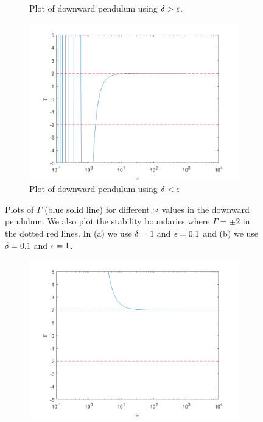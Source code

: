 \documentclass[12pt]{report}
\begin{document}
\begin{solution}
\begin{enumerate}
\begin{figure}[H]
\begin{subfigure}[b]{0.5\linewidth}
                \caption{Plot of downward pendulum using $\delta > {\epsilon}$.}
                \label{fig1:a}
                \vspace{4ex}
            \end{subfigure}%
            \begin{subfigure}[b]{0.5\linewidth}
                \centering
                \includegraphics[width=\linewidth]{images/d2.png}
                \caption{Plot of downward pendulum using $\delta < {\epsilon}$}
                \label{fig1:b}
                \vspace{4ex}
            \end{subfigure}
            \caption{Plots of $\Gamma$ (blue solid line) for different ${\omega}$ values in the downward pendulum. We also plot the stability boundaries where $\Gamma = \pm 2$ in the dotted red lines. In (a) we use $\delta = 1$ and ${\epsilon} = 0.1$ and (b) we use $\delta = 0.1$ and ${\epsilon} = 1$. }
            \label{fig1}
        \end{figure}
        \begin{figure}[H]
            \begin{subfigure}[b]{0.5\linewidth}
                \centering
                \includegraphics[width=\linewidth]{images/u1.png}

\end{subfigure}
\end{figure}
\end{enumerate}
\end{solution}
\end{document}
